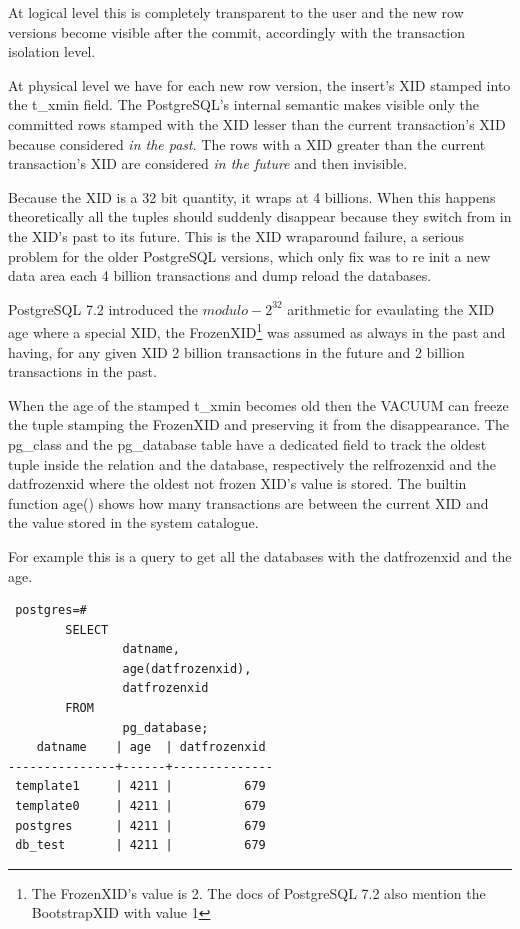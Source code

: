 At logical level this is completely transparent to the user and the new row versions become visible 
after the commit, accordingly with the transaction isolation level. \newline

At physical level we have for each new row version, the insert's XID stamped into the t\_xmin 
field. The PostgreSQL's internal semantic makes visible only the committed rows stamped with the 
XID lesser than the current transaction's XID because considered \textit{in the past}. The rows 
with 
a XID greater than the current transaction's XID are considered \textit{in the future} and then 
invisible.\newline

Because the XID is a 32 bit quantity, it wraps at 4 billions. When this happens theoretically all 
the tuples should suddenly disappear because they switch from in the XID's past to its future. This 
is the XID wraparound failure, a serious problem for the older 
PostgreSQL versions, which only fix was to re init a new data area each 4 billion transactions and 
dump reload the databases.\newline 

PostgreSQL 7.2 introduced the \begin{math}modulo-2^{32}\end{math} arithmetic for evaulating the XID 
age where a special XID, the FrozenXID\footnote{The FrozenXID's value is 2. The docs of PostgreSQL 
7.2 also mention the BootstrapXID with value 1} was assumed as always in the past and having, for 
any given XID 2 billion transactions in the future and 2 billion transactions in the past.\newline

When the age of the stamped t\_xmin becomes old then the VACUUM can freeze 
the tuple stamping the FrozenXID and preserving it from the disappearance. The pg\_class and the 
pg\_database table have a dedicated field to track the oldest tuple inside the relation and the 
database, respectively the relfrozenxid  and the datfrozenxid where the oldest not frozen XID's 
value is stored. The builtin function age() shows how many transactions are between 
the current XID and the value stored in the system catalogue. \newline

For example this is a query to get all the databases with the datfrozenxid and the age.\newpage

\begin{verbatim}
 postgres=# 
        SELECT 
                datname,
                age(datfrozenxid),
                datfrozenxid 
        FROM 
                pg_database;
    datname    | age  | datfrozenxid 
---------------+------+--------------
 template1     | 4211 |          679
 template0     | 4211 |          679
 postgres      | 4211 |          679
 db_test       | 4211 |          679

\end{verbatim}

